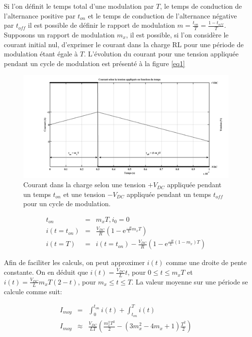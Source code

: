 Si l'on définit le temps total d'une modulation par $T$, le temps de conduction de l'alternance positive par $t_{on}$ et le temps de conduction de l'alternance négative par $t_{off}$ il est possible de définir le rapport de modulation $m = \frac{t_{on}}{T} = \frac{1-t_{off}}{T}$. Supposons un rapport de modulation $m_x$, il est possible, si l'on considère le courant initial nul, d'exprimer le courant dans la charge RL pour une période de modulation étant égale à $T$. L'évolution du courant pour une tension appliquée pendant un cycle de modulation est présenté à la figure \ref{eq1}
\begin{figure}
\centering
\includegraphics[scale=0.4]{fig/fig_courant_tension_mod.png}
\caption{Courant dans la charge selon une tension $+V_{DC}$ appliquée pendant un temps $t_{on}$ et une tension $-V_{DC}$ appliquée pendant un temps $t_{off}$ pour un cycle de modulation.}
\end{figure}
\begin{eqnarray}
t_{on} &=& m_x T, i_0 = 0\\
i\left(t = t_{on}\right) &=& \frac{V_{DC}}{R}\left(1 - \mbox{e}^{\frac{-R}{L}m_x T}\right)\\
i\left(t = T\right) &=& i\left(t = t_{on}\right) -  \frac{V_{DC}}{R}\left(1 - \mbox{e}^{\frac{-R}{L}(1-m_x)T}\right)
\end{eqnarray}

Afin de faciliter les calculs, on peut approximer $i(t)$ comme une droite de pente constante. On en déduit que $i(t) = \frac{V_{DC}}{L}t$, pour $0\leq t \leq m_x T$ et $i(t) = \frac{V_{DC}}{L} m_x T \left( 2 - t\right)$, pour $m_x\leq t \leq T$. La valeur moyenne sur une période se calcule comme suit:

\begin{eqnarray}
I_{moy} &=& \int_0^{t_{on}} i(t) + \int_{t_{on}}^{T} i(t)\\\label{eq_Imoy}
I_{moy} &\approx & \frac{V_{DC}}{LT}\left(\frac{m_x^2 T^2}{2} -(3m_x^2 -4m_x +1)\frac{T^2}{2}\right)
\end{eqnarray}

